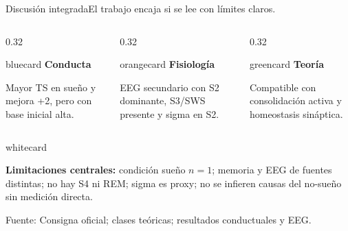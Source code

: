 \documentclass[aspectratio=169,10pt]{beamer}
\newcommand{\source}[1]{\vfill {\tiny\color{Muted}Fuente: #1}}
\newenvironment{card}[2][whitecard]{%
  \begin{beamercolorbox}[wd=#2,sep=0.20cm,rounded=true]{#1}\RaggedRight
}{\end{beamercolorbox}}
\begin{document}
\begin{frame}{Discusión integrada}{El trabajo encaja si se lee con límites claros.}
\begin{columns}[T,totalwidth=\textwidth]
\begin{column}{0.32\textwidth}\begin{card}[bluecard]{\linewidth}\textbf{Conducta}\par Mayor TS en sueño y mejora +2, pero con base inicial alta.\end{card}\end{column}
\begin{column}{0.32\textwidth}\begin{card}[orangecard]{\linewidth}\textbf{Fisiología}\par EEG secundario con S2 dominante, S3/SWS presente y sigma en S2.\end{card}\end{column}
\begin{column}{0.32\textwidth}\begin{card}[greencard]{\linewidth}\textbf{Teoría}\par Compatible con consolidación activa y homeostasis sináptica.\end{card}\end{column}
\end{columns}
\vspace{0.45cm}
\begin{card}[whitecard]{\textwidth}
\textbf{Limitaciones centrales:} condición sueño $n=1$; memoria y EEG de fuentes distintas; no hay S4 ni REM; sigma es proxy; no se infieren causas del no-sueño sin medición directa.
\end{card}
\source{Consigna oficial; clases teóricas; resultados conductuales y EEG.}
\end{frame}
\end{document}
